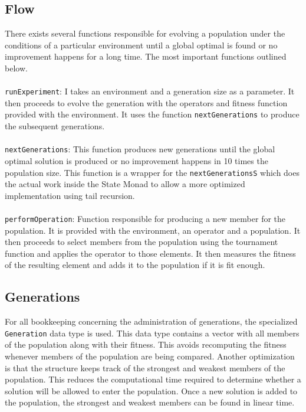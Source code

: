 \documentclass[10pt]{article}
\begin{document}
\subsection{Flow}

There exists several functions responsible for evolving a population under the conditions of a particular environment until a global optimal is found or no improvement happens for a long time. The most important functions outlined below.
\\\\
\verb+runExperiment+: I takes an environment and a generation size as a parameter. It then proceeds to evolve the generation with the operators and fitness function provided with the environment. It uses the function \verb+nextGenerations+ to produce the subsequent generations.
\\\\
\verb+nextGenerations+: This function produces new generations until the global optimal solution is produced or no improvement happens in 10 times the population size. This function is a wrapper for the \verb+nextGenerationsS+ which does the actual work inside the State Monad to allow a more optimized implementation using tail recursion.
\\\\
\verb+performOperation+: Function responsible for producing a new member for the population. It is provided with the environment, an operator and a population. It then proceeds to select members from the population using the tournament function and applies the operator to those elements. It then measures the fitness of the resulting element and adds it to the population if it is fit enough.

\subsection{Generations}

For all bookkeeping concerning the administration of generations, the specialized \verb+Generation+ data type is used. This data type contains a vector with all members of the population along with their fitness. This avoids recomputing the fitness whenever members of the population are being compared. Another optimization is that the structure keeps track of the strongest and weakest members of the population. This reduces the computational time required to determine whether a solution will be allowed to enter the population. Once a new solution is added to the population, the strongest and weakest members can be found in linear time.
\end{document}
